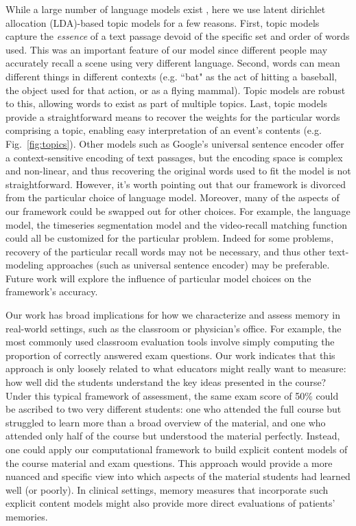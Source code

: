 \documentclass{article}
\begin{document}
While a large number of language models exist \citep[e.g., WAS, LSA, word2vec, universal sentence encoder;][]{SteyEtal04, LandEtal98, MikoEtal13, CerEtal18}, here we use latent dirichlet allocation (LDA)-based topic models for a few reasons.  First, topic models capture the \textit{essence} of a text passage devoid of the specific set and order of words used.  This was an important feature of our model since different people may accurately recall a scene using very different language. Second, words can mean different things in different contexts (e.g. ``bat" as the act of hitting a baseball, the object used for that action, or as a flying mammal).  Topic models are robust to this, allowing words to exist as part of multiple topics.  Last, topic models provide a straightforward means to recover the weights for the particular words comprising a topic, enabling easy interpretation of an event's contents (e.g. Fig.~\ref{fig:topics}). Other models such as Google's universal sentence encoder offer a context-sensitive encoding of text passages, but the encoding space is complex and non-linear, and thus recovering the original words used to fit the model is not straightforward. However, it's worth pointing out that our framework is divorced from the particular choice of language model. Moreover, many of the aspects of our framework could be swapped out for other choices. For example, the language model, the timeseries segmentation model and the video-recall matching function could all be customized for the particular problem. Indeed for some problems, recovery of the particular recall words may not be necessary, and thus other text-modeling approaches (such as universal sentence encoder) may be preferable. Future work will explore the influence of particular model choices on the framework's accuracy.

Our work has broad implications for how we characterize and assess memory in real-world settings, such as the classroom or physician's office.  For example, the most commonly used classroom evaluation tools involve simply computing the proportion of correctly answered exam questions.  Our work indicates that this approach is only loosely related to what educators might really want to measure: how well did the students understand the key ideas presented in the course?  Under this typical framework of assessment, the same exam score of 50\% could be ascribed to two very different students: one who attended the full course but struggled to learn more than a broad overview of the material, and one who attended only half of the course but understood the material perfectly.  Instead, one could apply our computational framework to build explicit content models of the course material and exam questions.  This approach would provide a more nuanced and specific view into which aspects of the material students had learned well (or poorly).  In clinical settings, memory measures that incorporate such explicit content models might also provide more direct evaluations of patients' memories.
\end{document}

